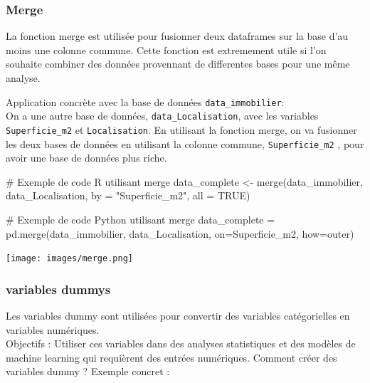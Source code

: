 \documentclass[
  letterpaper,
  DIV=11,
  numbers=noendperiod]{scrartcl}
\newenvironment{Shaded}{\begin{snugshade}}{\end{snugshade}}
\newcommand{\AttributeTok}[1]{\textcolor[rgb]{0.40,0.45,0.13}{#1}}
\newcommand{\CommentTok}[1]{\textcolor[rgb]{0.37,0.37,0.37}{#1}}
\newcommand{\ConstantTok}[1]{\textcolor[rgb]{0.56,0.35,0.01}{#1}}
\newcommand{\FunctionTok}[1]{\textcolor[rgb]{0.28,0.35,0.67}{#1}}
\newcommand{\NormalTok}[1]{\textcolor[rgb]{0.00,0.23,0.31}{#1}}
\newcommand{\OtherTok}[1]{\textcolor[rgb]{0.00,0.23,0.31}{#1}}
\newcommand{\StringTok}[1]{\textcolor[rgb]{0.13,0.47,0.30}{#1}}
\begin{document}
\subsubsection{Merge}\label{merge}

La fonction merge est utilisée pour fusionner deux dataframes sur la
base d'au moins une colonne commune. Cette fonction est extremement
utile si l'on souhaite combiner des données provennant de differentes
bases pour une même analyse.

Application concrète avec la base de données
\texttt{data\_immobilier}:\\
On a une autre base de données, \texttt{data\_Localisation}, avec les
variables \texttt{Superficie\_m2} et \texttt{Localisation}. En utilisant
la fonction merge, on va fusionner les deux bases de données en
utilisant la colonne commune, \texttt{Superficie\_m2} , pour avoir une
base de données plus riche.

\begin{Shaded}
\begin{Highlighting}[]
\CommentTok{\# Exemple de code R utilisant merge}
\NormalTok{data\_complete }\OtherTok{\textless{}{-}} \FunctionTok{merge}\NormalTok{(data\_immobilier, data\_Localisation, }\AttributeTok{by =} \StringTok{"Superficie\_m2"}\NormalTok{, }\AttributeTok{all =} \ConstantTok{TRUE}\NormalTok{)}
\end{Highlighting}
\end{Shaded}

\begin{Shaded}
\begin{Highlighting}[]
\CommentTok{\# Exemple de code Python utilisant merge}
\NormalTok{data\_complete }\OtherTok{=} \FunctionTok{pd.merge}\NormalTok{(data\_immobilier, data\_Localisation, }\AttributeTok{on=}\StringTok{\textquotesingle{}Superficie\_m2\textquotesingle{}}\NormalTok{, }\AttributeTok{how=}\StringTok{\textquotesingle{}outer\textquotesingle{}}\NormalTok{)}
\end{Highlighting}
\end{Shaded}

\begin{center}
\texttt{[image: images/merge.png]}
\end{center}

\subsubsection{variables dummys}\label{variables-dummys}

Les variables dummy sont utilisées pour convertir des variables
catégorielles en variables numériques.\\
Objectifs : Utiliser ces variables dans des analyses statistiques et des
modèles de machine learning qui requièrent des entrées numériques.
Comment créer des variables dummy ? Exemple concret :
\end{document}
